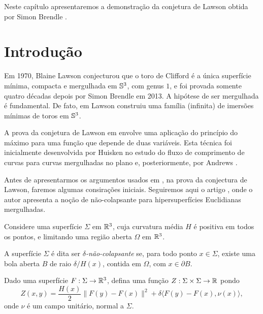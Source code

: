 Neste capítulo apresentaremos a demonstração da conjetura de
Lawson obtida por Simon Brendle \cite{Brendle2013a}.


\section{Introdu\c c\~ao}

Em 1970, Blaine Lawson \cite{Lawson1970a} conjecturou que o toro de 
Clifford é a única superfície mínima, compacta e mergulhada em $\mathbb{S}^3$,
com genus $1$, e foi provada somente quatro décadas depois por Simon
Brendle \cite{Brendle2013a} em 2013. A hipótese de ser mergulhada é
fundamental. De fato, em \cite{Lawson1970} Lawson construiu uma 
família (infinita) de imersões mínimas de toros em $\mathbb{S}^3$.

A prova da conjetura de Lawson em \cite{Brendle2013a} envolve uma 
aplicação do princípio do máximo para uma função que depende de 
duas vari\'aveis. Esta técnica foi inicialmente desenvolvida por Huisken
\cite{Huisken1998} no estudo do fluxo de comprimento de curvas para 
curvas mergulhadas no plano e, posteriormente, por Andrews 
\cite{Andrews2012}.

Antes de apresentarmos os argumentos usados em \cite{Brendle2013a},
na prova da conjectura de Lawson, faremos algumas consira\c c\~oes
iniciais. Seguiremos aqui o artigo \cite{Andrews2012}, onde o autor
apresenta a no\c c\~ao de n\~ao-colapsante para hipersuperf\'icies
Euclidianas mergulhadas.

Considere uma superf\'icie $\Sigma$ em $\mathbb R^3$, cuja curvatura
m\'edia $H$ \'e positiva em todos os pontos, e limitando uma 
regi\~ao aberta $\Omega$ em $\mathbb R^3$.

\begin{definicao}
A superf\'icie $\Sigma$ \'e dita ser {\em $\delta$-n\~ao-colapsante}
se, para todo ponto $x\in\Sigma$, existe uma bola aberta $B$ de
raio $\delta/H(x)$, contida em $\Omega$, com $x\in\partial B$. 
\end{definicao}

Dado uma superf\'icie $F:\Sigma\to\mathbb R^3$, defina uma fun\c c\~ao
$Z:\Sigma\times\Sigma\to\mathbb R$ pondo
\[
Z(x,y) = \frac{H(x)}{2}\|F(y)-F(x)\|^2 + \delta\langle F(y)-F(x), \nu(x)\rangle,
\]
onde $\nu$ \'e um campo unit\'ario, normal a $\Sigma$.

